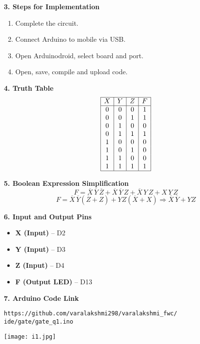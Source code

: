 \documentclass[12pt]{article}
\begin{document}
\begin{multicols}{2}
\vspace{1em}
\noindent\textbf{3. Steps for Implementation}
\begin{enumerate}
    \item Complete the circuit.
    \item Connect Arduino to mobile via USB.
    \item Open Arduinodroid, select board and port.
    \item Open, save, compile and upload code.
\end{enumerate}

\vspace{1em}
\noindent\textbf{4. Truth Table}
\[
\begin{array}{|c|c|c|c|}
\hline
X & Y & Z & F \\
\hline
0 & 0 & 0 & 1 \\
0 & 0 & 1 & 1 \\
0 & 1 & 0 & 0 \\
0 & 1 & 1 & 1 \\
1 & 0 & 0 & 0 \\
1 & 0 & 1 & 0 \\
1 & 1 & 0 & 0 \\
1 & 1 & 1 & 1 \\
\hline
\end{array}
\]

\vspace{1em}
\noindent\textbf{5. Boolean Expression Simplification}
\[
F = \overline{X}\,\overline{Y}\,\overline{Z} + \overline{X}\,\overline{Y}\,Z + \overline{X}\,Y\,Z + X\,Y\,Z
\]
\[
F = \overline{X}\,\overline{Y}(\overline{Z} + Z) + YZ(\overline{X} + X)
\Rightarrow \overline{X}\,\overline{Y} + YZ
\]

\end{multicols}

\vspace{1em}
\noindent\textbf{6. Input and Output Pins}
\begin{itemize}
    \item \textbf{X (Input)} – D2
    \item \textbf{Y (Input)} – D3
    \item \textbf{Z (Input)} – D4
    \item \textbf{F (Output LED)} – D13
\end{itemize}

\vspace{1em}
\noindent\textbf{7. Arduino Code Link}

\noindent\raggedright
\texttt{https://github.com/varalakshmi298/varalakshmi\_fwc/} \\
\texttt{ide/gate/gate\_q1.ino}

\vspace{1em}
\noindent\texttt{[image: i1.jpg]}
\end{document}
